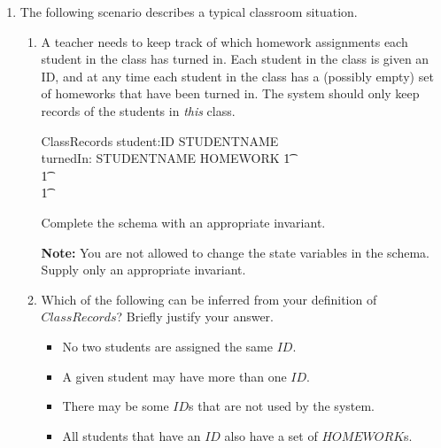 \documentclass{article}
\begin{document}
\begin{enumerate}
\begin{enumerate}
\end{enumerate}

\item The following scenario describes a typical classroom
situation.

\begin{enumerate} \item A teacher needs to keep track of
which homework assignments each student in the class has turned
in. Each student in the class is given an ID, and at any time each
student in the class has a (possibly empty) set of homeworks that
have been turned in. The system should only keep records of the
students in {\em this\/} class.

\begin{zed}
\end{zed}
\begin{schema}{ClassRecords}
    student:ID \pfun STUDENTNAME \\
    turnedIn: STUDENTNAME \pfun \power HOMEWORK
\where
\t1 \\
\t1 \\
\t1
\end{schema}

Complete the schema with an appropriate invariant.

\textbf{Note:} You are not allowed to change the state variables
in the schema. Supply only an appropriate invariant.


\item Which of the following can be inferred from your definition
of $ClassRecords$? Briefly justify your answer.

\begin{itemize}
\item No two students are assigned the same $ID$.

\item A given student may have more than one $ID$.

\item There may be some $ID$s that are not used by the system.

\item All students that have an $ID$ also have a set of
$HOMEWORK$s.


\end{itemize}
\end{enumerate}
\end{enumerate}
\end{document}
